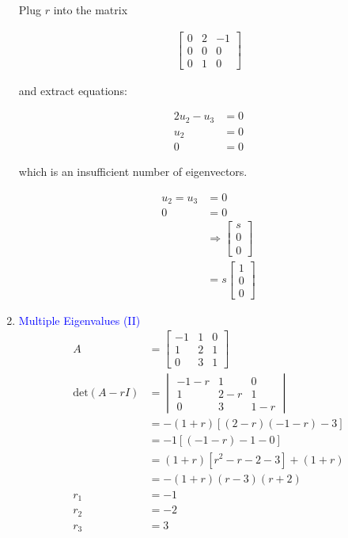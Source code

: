 \documentclass[twocolumn,draft]{article}
\newcommand{\bt}[1]{\textcolor{blue}{#1}}
\begin{document}
\begin{enumerate}
		Plug $r$ into the matrix
		
		\begin{align*}
			\begin{bmatrix}
				0 & 2 & -1 \\
				0 & 0 & 0 \\ 
				0 & 1 & 0
			\end{bmatrix}
		\end{align*}
		
		and extract equations:
		
		\begin{align*}
			2u_{2} - u_{3} &= 0 \\
			u_{2} &= 0 \\
			0 &= 0
		\end{align*}
		
		which is an insufficient number of eigenvectors.
		
		\begin{align*}
			u_{2} = u_{3} &= 0 \\
			0 &= 0 \\
			&\Rightarrow
			\begin{bmatrix}
				s \\ 0 \\ 0
			\end{bmatrix} \\
			&= s \begin{bmatrix}
				 	   1 \\ 0 \\ 0
				 \end{bmatrix}
		\end{align*}
	
	\item \bt{Multiple Eigenvalues (II)}
		\begin{align*}
			A &= \begin{bmatrix}
					-1 & 1 & 0 \\
					 1 & 2 & 1 \\
					 0 & 3 & 1
				 \end{bmatrix} \\
			\text{det}(A-rI) &= \begin{vmatrix}
									-1-r & 1 & 0 \\
									 1 & 2-r & 1 \\
									 0 & 3 & 1-r
								\end{vmatrix} \\
				 &= -(1+r)\left[(2-r)(-1-r)-3\right] \\
				 &= -1\left[(-1-r)-1-0\right] \\
				 &= (1+r)\left[r^{2}-r-2-3\right] + (1+r) \\
				 &= -(1+r)(r-3)(r+2) \\
				 r_{1} &= -1 \\
				 r_{2} &= -2 \\
				 r_{3} &= 3
		\end{align*}
		

\end{enumerate}
\end{document}
